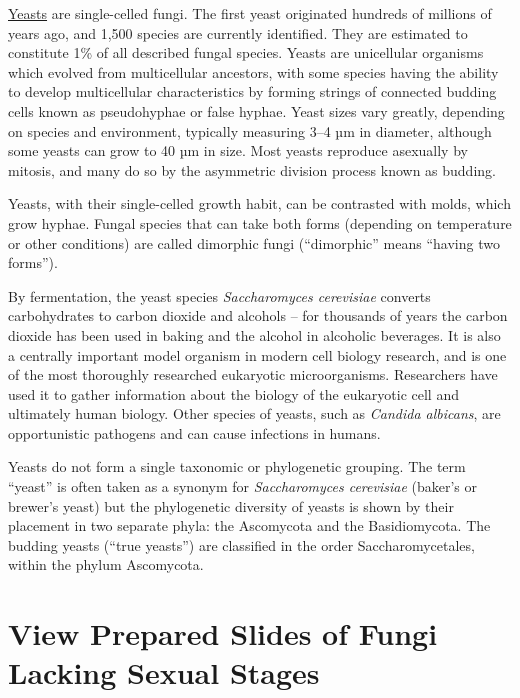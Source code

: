 \href{https://en.wikipedia.org/wiki/Yeast}{Yeasts} are single-celled
fungi. The first yeast originated hundreds of millions of years ago, and
1,500 species are currently identified. They are estimated to constitute
1\% of all described fungal species. Yeasts are unicellular organisms
which evolved from multicellular ancestors, with some species having the
ability to develop multicellular characteristics by forming strings of
connected budding cells known as pseudohyphae or false hyphae. Yeast
sizes vary greatly, depending on species and environment, typically
measuring 3--4 µm in diameter, although some yeasts can grow to 40 µm in
size. Most yeasts reproduce asexually by mitosis, and many do so by the
asymmetric division process known as budding.

Yeasts, with their single-celled growth habit, can be contrasted with
molds, which grow hyphae. Fungal species that can take both forms
(depending on temperature or other conditions) are called dimorphic
fungi (``dimorphic'' means ``having two forms'').

By fermentation, the yeast species \emph{Saccharomyces cerevisiae}
converts carbohydrates to carbon dioxide and alcohols -- for thousands
of years the carbon dioxide has been used in baking and the alcohol in
alcoholic beverages. It is also a centrally important model organism in
modern cell biology research, and is one of the most thoroughly
researched eukaryotic microorganisms. Researchers have used it to gather
information about the biology of the eukaryotic cell and ultimately
human biology. Other species of yeasts, such as \emph{Candida albicans},
are opportunistic pathogens and can cause infections in humans.

Yeasts do not form a single taxonomic or phylogenetic grouping. The term
``yeast'' is often taken as a synonym for \emph{Saccharomyces
cerevisiae} (baker's or brewer's yeast) but the phylogenetic diversity
of yeasts is shown by their placement in two separate phyla: the
Ascomycota and the Basidiomycota. The budding yeasts (``true yeasts'')
are classified in the order Saccharomycetales, within the phylum
Ascomycota.

\section{View Prepared Slides of Fungi Lacking Sexual
Stages}\label{view-the-prepared-slides-of-fungi-lacking-sexual-stages}

